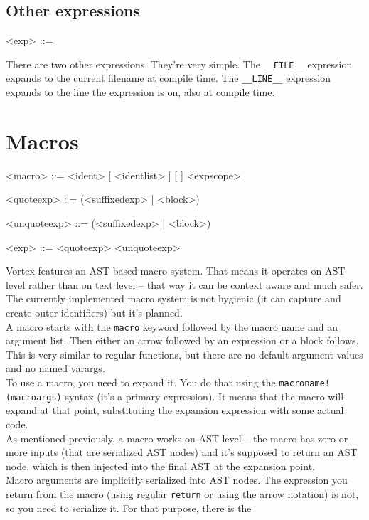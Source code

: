 \documentclass{article}
\newenvironment{bnf}
{
\begin{mdframed}
\begin{grammar}
}
{
\end{grammar}
\end{mdframed}
}
\begin{document}
\subsection{Other expressions}
\begin{bnf}
<exp> ::= 
    \alt {}
\end{bnf}
There are two other expressions. They're very simple. The \verb|__FILE__|
expression expands to the current filename at compile time. The \verb|__LINE__|
expression expands to the line the expression is on, also at compile time.

\section{Macros}
\begin{bnf}
<macro> ::=  <ident> [ <identlist> ] [  ] <expscope>

<quoteexp> ::=  (<suffixedexp> | <block>)

<unquoteexp> ::=  (<suffixedexp> | <block>)

<exp> ::= <quoteexp>
    \alt <unquoteexp>
\end{bnf}
Vortex features an AST based macro system. That means it operates on AST level
rather than on text level -- that way it can be context aware and much safer.
The currently implemented macro system is not hygienic (it can capture and
create outer identifiers) but it's planned.\\
A macro starts with the \verb|macro| keyword followed by the macro name
and an argument list. Then either an arrow followed by an expression or
a block follows. This is very similar to regular functions, but there are
no default argument values and no named varargs.\\
To use a macro, you need to expand it. You do that using the
\verb|macroname!(macroargs)| syntax (it's a primary expression). It means
that the macro will expand at that point, substituting the expansion expression
with some actual code.\\
As mentioned previously, a macro works on AST level -- the macro has zero or
more inputs (that are serialized AST nodes) and it's supposed to return an
AST node, which is then injected into the final AST at the expansion point.\\
Macro arguments are implicitly serialized into AST nodes. The expression you
return from the macro (using regular \verb|return| or using the arrow notation)
is not, so you need to serialize it. For that purpose, there is the
\end{document}
